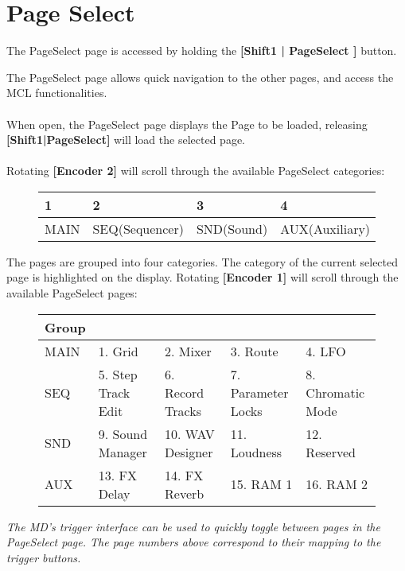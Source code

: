 \chapter{Page Select}
The PageSelect page is accessed by holding the \textbf{[Shift1 | PageSelect ]} button.

The PageSelect page allows quick navigation to the other pages, and access the MCL functionalities.
\\
\\
When open, the PageSelect page displays the Page to be loaded, releasing \textbf{[Shift1|PageSelect]} will load
the selected page.
\\
\\
Rotating \textbf{[Encoder 2]} will scroll through the available PageSelect categories:

\begin{figure}[h]
    \begin{tabular}{|l|l|l|l|}
    \hline
    \rowcolor[HTML]{C0C0C0} 
    1    & 2              & 3          & 4              \\ \hline
    MAIN & SEQ(Sequencer) & SND(Sound) & AUX(Auxiliary) \\ \hline
    \end{tabular}
\end{figure}

The pages are grouped into four categories. The category of the current selected page is highlighted on the display.
Rotating \textbf{[Encoder 1]} will scroll through the available PageSelect pages:

\begin{figure}[h]
    \begin{tabular}{|l|l|l|l|l|}
    \hline
    \rowcolor[HTML]{C0C0C0} 
    {\color[HTML]{000000} Group} & \multicolumn{4}{l|}{\cellcolor[HTML]{C0C0C0}{\color[HTML]{000000} Pages}}      \\ \hline
    MAIN                              & 1. Grid            & 2. Mixer         & 3. Route           & 4. LFO            \\ \hline
    SEQ                               & 5. Step Track Edit & 6. Record Tracks & 7. Parameter Locks & 8. Chromatic Mode \\ \hline
    SND                               & 9. Sound Manager   & 10. WAV Designer & 11. Loudness       & 12. Reserved      \\ \hline
    AUX                               & 13. FX Delay       & 14. FX Reverb    & 15. RAM 1          & 16. RAM 2         \\ \hline
    \end{tabular}
\end{figure}

\textit{The MD's trigger interface can be used to quickly toggle between pages in the PageSelect page. The page numbers above correspond to their mapping to the trigger buttons. }






